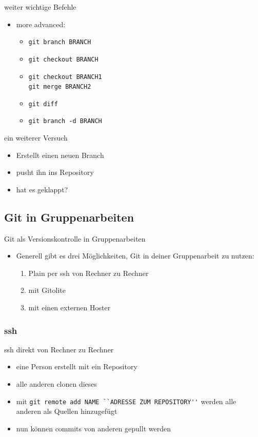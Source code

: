 \documentclass{beamer}
\begin{document}
\begin{frame}[fragile]{weiter wichtige Befehle}
	\begin{itemize}
		\item more advanced:
			\begin{itemize}
				\item \verb+git branch BRANCH+
				\item \verb+git checkout BRANCH+
				\item \verb+git checkout BRANCH1+\\
					\verb+git merge BRANCH2+
				\item \verb+git diff+
				\item \verb+git branch -d BRANCH+
			\end{itemize}
	\end{itemize}
	\begin{block}{ein weiterer Versuch}
		\begin{itemize}
			\item Erstellt einen neuen Branch
			\item pusht ihn ins Repository
			\item hat es geklappt?
		\end{itemize}
	\end{block}
\end{frame}

\subsection{Git in Gruppenarbeiten}
\begin{frame}{Git als Versionskontrolle in Gruppenarbeiten}
	\begin{itemize}
		\item Generell gibt es drei Möglichkeiten, Git in deiner Gruppenarbeit zu nutzen:
			\begin{enumerate}
				\item Plain per ssh von Rechner zu Rechner
				\item mit Gitolite
				\item mit einen externen Hoster
			\end{enumerate}
	\end{itemize}
\end{frame}

\subsubsection{ssh}
\begin{frame}[fragile]{ssh direkt von Rechner zu Rechner}
	\begin{itemize}
		\item eine Person erstellt mit ein Repository
		\item alle anderen clonen dieses
		\item mit \verb|git remote add NAME ``ADRESSE ZUM REPOSITORY''| werden alle anderen als Quellen hinzugefügt
		\item nun können commits von anderen gepullt werden
	\end{itemize}
\end{frame}
\end{document}
